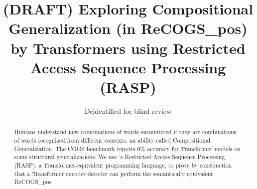 \documentclass[11pt]{article}
\title{(DRAFT) Exploring Compositional Generalization (in ReCOGS\_pos) by Transformers using Restricted Access Sequence Processing (RASP)}
\author{Deidentified for blind review}
\begin{document}
\maketitle
\begin{abstract}
Humans understand new combinations of words encountered if they are combinations of words recognized from different contexts, an ability called Compositional Generalization.
The COGS benchmark \cite{KimLinzen2020} reports 0\% accuracy for Transformer models on some structural generalizations.
We use \cite{Weiss2021}'s Restricted Access Sequence Processing (RASP), a Transformer-equivalent programming language, to prove by construction that a Transformer encoder-decoder
can perform the semantically equivalent ReCOGS\_pos

\end{abstract}
\end{document}

